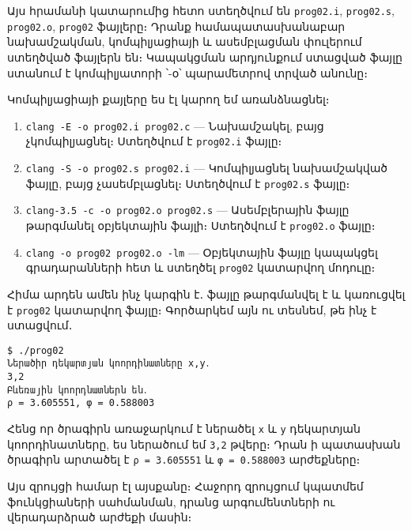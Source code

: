 Այս հրամանի կատարումից հետո ստեղծվում են \texttt{prog02.i},
\texttt{prog02.s}, \texttt{prog02.o}, \texttt{prog02} ֆայլերը։ Դրանք
համապատասխանաբար նախամշակման, կոմպիլյացիայի և ասեմբլացման փուլերում
ստեղծված ֆայլերն են։ Կապակցման արդյունքում ստացված ֆայլը ստանում է
կոմպիլյատորի ՝-օ՝ պարամետրով տրված անունը։

Կոմպիլյացիայի քայլերը ես էլ կարող եմ առանձնացնել։

\begin{enumerate}
\item \texttt{clang -E -o prog02.i prog02.c} --- Նախամշակել, բայց
  չկոմպիլյացնել։ Ստեղծվում է \texttt{prog02.i} ֆայլը։
\item \texttt{clang -S -o prog02.s prog02.i} --- Կոմպիլյացնել նախամշակված
  ֆայլը, բայց չասեմբլացնել։ Ստեղծվում է \texttt{prog02.s} ֆայլը։
\item \texttt{clang-3.5 -c -o prog02.o prog02.s} --- Ասեմբլերային ֆայլը
  թարգմանել օբյեկտային ֆայլի։ Ստեղծվում է \texttt{prog02.o} ֆայլը։
\item \texttt{clang -o prog02 prog02.o -lm} --- Օբյեկտային ֆայլը կապակցել
  գրադարանների հետ և ստեղծել \texttt{prog02} կատարվող մոդուլը։
\end{enumerate}

Հիմա արդեն ամեն ինչ կարգին է․ ֆայլը թարգմանվել է և կառուցվել է
\texttt{prog02} կատարվող ֆայլը։ Գործարկեմ այն ու տեսնեմ, թե ինչ է
ստացվում․

\begin{verbatim}
$ ./prog02
Ներածիր դեկարտյան կոորդինատները x,y․
3,2
Բևեռային կոորդնատներն են․
ρ = 3.605551, φ = 0.588003
\end{verbatim}

Հենց որ ծրագիրն առաջարկում է ներածել \texttt{x} և \texttt{y} դեկարտյան
կոորդինատները, ես ներածում եմ \texttt{3,2} թվերը։ Դրան ի պատասխան
ծրագիրն արտածել է \texttt{ρ\ =\ 3.605551} և \texttt{φ\ =\ 0.588003}
արժեքները։

Այս զրույցի համար էլ այսքանը։ Հաջորդ զրույցում կպատմեմ ֆունկցիաների
սահմանման, դրանց արգումենտների ու վերադարձրած արժեքի մասին։
